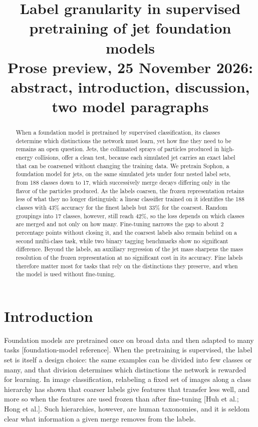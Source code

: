 \documentclass[11pt,a4paper]{article}
\title{\Large Label granularity in supervised pretraining of jet foundation models\\[4pt]
\normalsize Prose preview, 25 November 2026: abstract, introduction, discussion, two model paragraphs}
\author{}
\date{}
\newcommand{\bn}[1]{\textcolor{blue!70!black}{#1}}
\newcommand{\ct}[1]{\textcolor{black!55}{[#1]}}
\begin{document}
\maketitle
{}

\begin{abstract}
\noindent
When a foundation model is pretrained by supervised classification, its classes determine which
distinctions the network must learn, yet how fine they need to be remains an open question.
Jets, the collimated sprays of particles produced in high-energy collisions, offer a clean test,
because each simulated jet carries an exact label that can be coarsened without changing the
training data.
We pretrain Sophon, a foundation model for jets, on the same simulated jets under four nested label sets,
from 188 classes down to 17, which successively merge decays differing only in the flavor of the
particles produced.
As the labels coarsen, the frozen representation retains less of what they no longer distinguish:
a linear classifier trained on it identifies the 188 classes with \bn{43\%} accuracy for the
finest labels but \bn{33\%} for the coarsest.
Random groupings into 17 classes, however, still reach \bn{42\%}, so the loss depends on which
classes are merged and not only on how many.
Fine-tuning narrows the gap to about \bn{2} percentage points without closing it, and the
coarsest labels also remain behind on a second multi-class task, while two binary tagging
benchmarks show no significant difference.
Beyond the labels, an auxiliary regression of the jet mass sharpens the mass resolution of the
frozen representation at no significant cost in its accuracy.
Fine labels therefore matter most for tasks that rely on the distinctions they preserve, and
when the model is used without fine-tuning.
\end{abstract}

\section{Introduction}

Foundation models are pretrained once on broad data and then adapted to many tasks
\ct{foundation-model reference}.
When the pretraining is supervised, the label set is itself a design choice: the same examples can
be divided into few classes or many, and that division determines which distinctions the network
is rewarded for learning.
In image classification, relabeling a fixed set of images along a class hierarchy has shown that
coarser labels give features that transfer less well, and more so when the features are used
frozen than after fine-tuning \ct{Huh et al.; Hong et al.}.
Such hierarchies, however, are human taxonomies, and it is seldom clear what information a
given merge removes from the labels.
\end{document}
